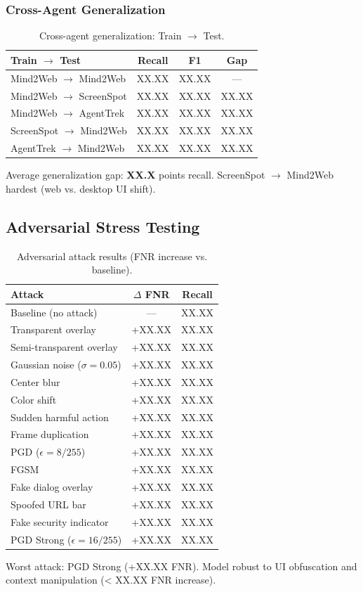 \documentclass[11pt,a4paper]{article}
\begin{document}
\subsubsection{Cross-Agent Generalization}
\begin{table}[H]
\centering
\caption{Cross-agent generalization: Train $\to$ Test.}
\label{tab:ablation_cross_agent}
\begin{tabular}{lccc}
\toprule
Train $\to$ Test & Recall & F1 & Gap \\
\midrule
Mind2Web $\to$ Mind2Web & XX.XX & XX.XX & --- \\
Mind2Web $\to$ ScreenSpot & XX.XX & XX.XX & XX.XX \\
Mind2Web $\to$ AgentTrek & XX.XX & XX.XX & XX.XX \\
ScreenSpot $\to$ Mind2Web & XX.XX & XX.XX & XX.XX \\
AgentTrek $\to$ Mind2Web & XX.XX & XX.XX & XX.XX \\
\bottomrule
\end{tabular}
\end{table}
Average generalization gap: \textbf{XX.X} points recall. ScreenSpot $\to$ Mind2Web hardest (web vs. desktop UI shift).

\subsection{Adversarial Stress Testing}
\begin{table}[H]
\centering
\caption{Adversarial attack results (FNR increase vs. baseline).}
\label{tab:adversarial}
\begin{tabular}{lcc}
\toprule
Attack & $\Delta$ FNR & Recall \\
\midrule
Baseline (no attack) & --- & XX.XX \\
Transparent overlay & +XX.XX & XX.XX \\
Semi-transparent overlay & +XX.XX & XX.XX \\
Gaussian noise ($\sigma=0.05$) & +XX.XX & XX.XX \\
Center blur & +XX.XX & XX.XX \\
Color shift & +XX.XX & XX.XX \\
Sudden harmful action & +XX.XX & XX.XX \\
Frame duplication & +XX.XX & XX.XX \\
PGD ($\epsilon=8/255$) & +XX.XX & XX.XX \\
FGSM & +XX.XX & XX.XX \\
Fake dialog overlay & +XX.XX & XX.XX \\
Spoofed URL bar & +XX.XX & XX.XX \\
Fake security indicator & +XX.XX & XX.XX \\
PGD Strong ($\epsilon=16/255$) & +XX.XX & XX.XX \\
\bottomrule
\end{tabular}
\end{table}
Worst attack: PGD Strong (+XX.XX FNR). Model robust to UI obfuscation and context manipulation (< XX.XX FNR increase).
\end{document}
